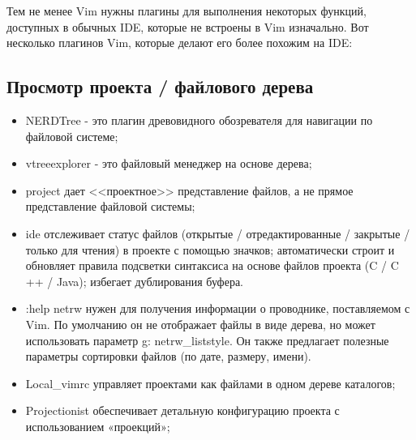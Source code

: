 Тем не менее Vim нужны плагины для выполнения некоторых функций, доступных в обычных IDE, которые 
не встроены в Vim изначально. Вот несколько плагинов Vim, которые делают его более похожим на IDE:\\

\subsection{Просмотр проекта / файлового дерева}
\begin{itemize}
    \item NERDTree - это плагин древовидного обозревателя для навигации по файловой системе;\\
    \item vtreeexplorer - это файловый менеджер на основе дерева;\\
    \item project дает <<проектное>> представление файлов, а не прямое представление файловой системы;\\
    \item ide отслеживает статус файлов (открытые / отредактированные / закрытые / только для чтения) 
        в проекте с помощью значков; автоматически строит и обновляет правила подсветки синтаксиса 
        на основе файлов проекта (C / C ++ / Java); 
        избегает дублирования буфера.\\
    \item :help netrw нужен для получения информации о проводнике, поставляемом с Vim. По 
        умолчанию он не отображает файлы в виде дерева, но может использовать параметр 
        g: netrw\_liststyle. Он также предлагает полезные параметры сортировки файлов (по дате, 
        размеру, имени).\\
    \item Local\_vimrc управляет проектами как файлами в одном дереве каталогов;\\
    \item Projectionist обеспечивает детальную конфигурацию проекта с использованием «проекций»;\\
\end{itemize}

